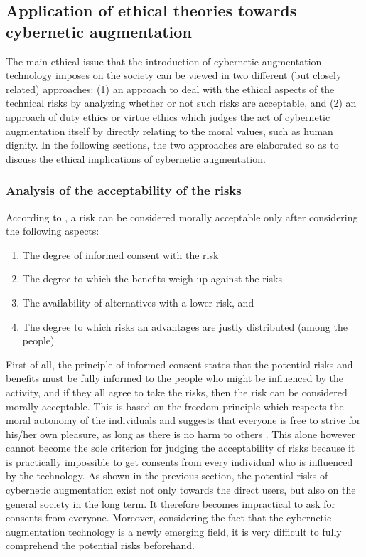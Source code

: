 \subsection{Application of ethical theories towards cybernetic augmentation}
The main ethical issue that the introduction of cybernetic augmentation technology imposes on the society can be viewed in two different (but closely related) approaches: (1) an approach to deal with the ethical aspects of the technical risks by analyzing whether or not such risks are acceptable, and (2) an approach of duty ethics or virtue ethics which judges the act of cybernetic augmentation itself by directly relating to the moral values, such as human dignity. In the following sections, the two approaches are elaborated so as to discuss the ethical implications of cybernetic augmentation.


\subsubsection{Analysis of the acceptability of the risks}
According to \cite{Ethics_textbook}, a risk can be considered morally acceptable only after considering the following aspects:
\begin{enumerate}
	\item The degree of informed consent with the risk
	\item The degree to which the benefits weigh up against the risks
	\item The availability of alternatives with a lower risk, and
	\item The degree to which risks an advantages are justly distributed (among the people)
\end{enumerate}

First of all, the principle of informed consent states that the potential risks and benefits must be fully informed to the people who might be influenced by the activity, and if they all agree to take the risks, then the risk can be considered morally acceptable. This is based on the freedom principle which respects the moral autonomy of the individuals and suggests that everyone is free to strive for his/her own pleasure, as long as there is no harm to others \cite{Ethics_textbook}. This alone however cannot become the sole criterion for judging the acceptability of risks because it is practically impossible to get consents from every individual who is influenced by the technology. As shown in the previous section, the potential risks of cybernetic augmentation exist not only towards the direct users, but also on the general society in the long term. It therefore becomes impractical to ask for consents from everyone. Moreover, considering the fact that the cybernetic augmentation technology is a newly emerging field, it is very difficult to fully comprehend the potential risks beforehand. 

